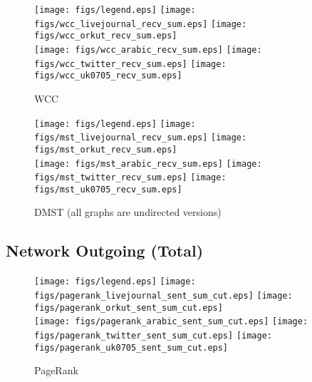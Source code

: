 \documentclass{article}
\newcommand{\bline}[1][1]{\vspace{#1\baselineskip}}
\begin{document}
\begin{figure}[!h]
  \bline[3.5]
  \centering
  \texttt{[image: figs/legend.eps]}\hspace{3em}%
  \texttt{[image: figs/wcc\_livejournal\_recv\_sum.eps]}\hspace{1em}%
  \texttt{[image: figs/wcc\_orkut\_recv\_sum.eps]}\\
  \texttt{[image: figs/wcc\_arabic\_recv\_sum.eps]}\hspace{1em}%
  \texttt{[image: figs/wcc\_twitter\_recv\_sum.eps]}\hspace{1em}%
  \texttt{[image: figs/wcc\_uk0705\_recv\_sum.eps]}
  \caption{WCC}
\end{figure}

\begin{figure}[!h]
  \bline[3.5]
  \centering
  \texttt{[image: figs/legend.eps]}\hspace{3em}%
  \texttt{[image: figs/mst\_livejournal\_recv\_sum.eps]}\hspace{1em}%
  \texttt{[image: figs/mst\_orkut\_recv\_sum.eps]}\\
  \texttt{[image: figs/mst\_arabic\_recv\_sum.eps]}\hspace{1em}%
  \texttt{[image: figs/mst\_twitter\_recv\_sum.eps]}\hspace{1em}%
  \texttt{[image: figs/mst\_uk0705\_recv\_sum.eps]}
  \caption{DMST (all graphs are undirected versions)}
\end{figure}

\pagebreak
\subsection{Network Outgoing (Total)}
\begin{figure}[!h]
  \bline[1]
  \centering
  \texttt{[image: figs/legend.eps]}\hspace{3em}%
  \texttt{[image: figs/pagerank\_livejournal\_sent\_sum\_cut.eps]}\hspace{1em}%
  \texttt{[image: figs/pagerank\_orkut\_sent\_sum\_cut.eps]}\\
  \texttt{[image: figs/pagerank\_arabic\_sent\_sum\_cut.eps]}\hspace{1em}%
  \texttt{[image: figs/pagerank\_twitter\_sent\_sum\_cut.eps]}\hspace{1em}%
  \texttt{[image: figs/pagerank\_uk0705\_sent\_sum\_cut.eps]}
  \caption{PageRank}
\end{figure}
\end{document}
